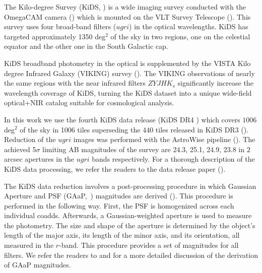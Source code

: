 \documentclass[fleqn,usenatbib,useAMS]{mnras}
\begin{document}
The Kilo-degree Survey (KiDS, \citealt{kids}) is a wide 
imaging survey conducted with the OmegaCAM camera (\citealt{omegacam}) which is mounted on the VLT Survey Telescope (\citealt{vst}). This survey uses four broad-band filters ($ugri$) in the optical wavelengths. KiDS has targeted approximately 1350 deg$^2$ of the sky in two regions, one on the celestial equator and the other one in the South Galactic cap. 

KiDS broadband photometry in the optical is supplemented by the VISTA Kilo degree Infrared Galaxy (VIKING) survey (\citealt{irwin2004,lewis2010,Edge2013,Gonz2018}). The VIKING observations of nearly the same regions with the near infrared filters $ZYJHK_{s}$ significantly increase the wavelength coverage of KiDS, turning the KiDS dataset into a unique wide-field optical+NIR catalog suitable for cosmological analysis.

In this work we use the fourth KiDS data release (KiDS DR4 \citealt{kuijken2019}) which covers $1006$ deg$^{2}$ of the sky in 1006 tiles superseding the 440 tiles released in KiDS DR3 (\citealt{kids_dr3}). Reduction of the $ugri$ images was performed with the AstroWise pipeline (\citealt{omegacam}).  
The achieved 5$\sigma$ limiting AB magnitudes of the survey are 24.3, 25.1, 24.9, 23.8 in $2$ arcsec apertures in the $ugri$ bands respectively. For a thorough description of the KiDS data processing, we refer the readers to the data release paper (\citealt{kuijken2019}). 


The KiDS data reduction involves a post-processing procedure in which Gaussian Aperture and PSF (GAaP,~\citealt{gaap}) magnitudes are derived (\citealt{kuijken2015}). This procedure is performed in the following way. First, the PSF is homogenized across each individual coadds. Afterwards, a Gaussian-weighted aperture is used to measure the photometry. The size and shape of the aperture is determined by the object's length of the major axis, its length of the minor axis, and its orientation, all measured in the $r$-band. This procedure provides a set of magnitudes for all filters. We refer the readers to \citet{kuijken2015} and \citet{kids_dr3} for a more detailed discussion of the derivation of GAaP magnitudes.
\end{document}
